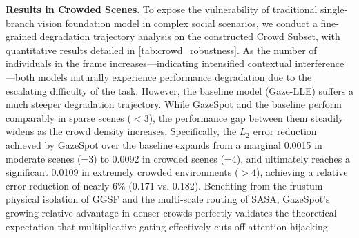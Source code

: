 \documentclass[sigconf,review,anonymous,screen]{acmart}
\begin{document}
\begin{table}[t]
  \centering
  \caption{Performance comparison and degradation analysis across different crowd densities.}
  \label{tab:crowd_robustness}
\end{table}

\textbf{Results in Crowded Scenes}. To expose the vulnerability of traditional single-branch vision foundation model in complex social scenarios, we conduct a fine-grained degradation trajectory analysis on the constructed Crowd Subset, with quantitative results detailed in \autoref{tab:crowd_robustness}. As the number of individuals in the frame increases—indicating intensified contextual interference—both models naturally experience performance degradation due to the escalating difficulty of the task. However, the baseline model (Gaze-LLE) suffers a much steeper degradation trajectory. While GazeSpot and the baseline perform comparably in sparse scenes ($<3$), the performance gap between them steadily widens as the crowd density increases. Specifically, the $L_2$ error reduction achieved by GazeSpot over the baseline expands from a marginal 0.0015 in moderate scenes (=3) to 0.0092 in crowded scenes (=4), and ultimately reaches a significant 0.0109 in extremely crowded environments ($>4$), achieving a relative error reduction of nearly 6\% (0.171 vs. 0.182). Benefiting from the frustum physical isolation of GGSF and the multi-scale routing of SASA, GazeSpot's growing relative advantage in denser crowds perfectly validates the theoretical expectation that multiplicative gating effectively cuts off attention hijacking.
\end{document}
